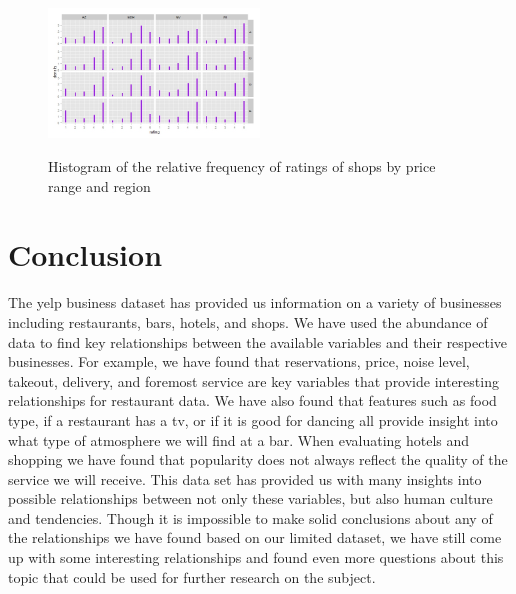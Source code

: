 \documentclass[11pt]{article}
\begin{document}
\begin{figure}[h!]
           \caption{Histogram of the relative frequency of ratings of shops by price range and region}
	\centering
	\includegraphics[width=0.5\textwidth]{Figures/shopping3.jpeg}
           \label{shopping3}
\end{figure}


\section{Conclusion}
	The yelp business dataset has provided us information on a variety of businesses including restaurants, bars, hotels, and shops.  We have used the abundance of data to find key relationships between the available variables and their respective businesses.  For example, we have found that reservations, price, noise level, takeout, delivery, and foremost service are key variables that provide interesting relationships for restaurant data.  We have also found that features such as food type, if a restaurant has a tv, or if it is good for dancing all provide insight into what type of atmosphere we will find at a bar.  When evaluating  hotels and shopping we have found that popularity does not always reflect the quality of the service we will receive.  This data set has provided us with many insights into possible relationships between not only these variables, but also human culture and tendencies.  Though it is impossible to make solid conclusions about any of the relationships we have found based on our limited dataset, we have still come up with some interesting relationships and found even more questions about this topic that could be used for further research on the subject.
\end{document}

